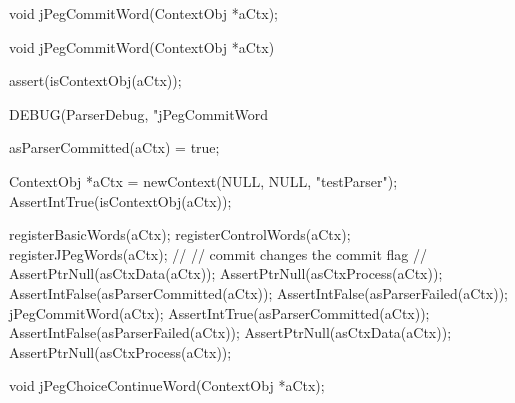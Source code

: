 \startTestSuite[jPegCommitWord]

\startCHeader
void jPegCommitWord(ContextObj *aCtx);
\stopCHeader

\startCCode
void jPegCommitWord(ContextObj *aCtx) {
  assert(isContextObj(aCtx));

  DEBUG(ParserDebug, "jPegCommitWord%
  
  asParserCommitted(aCtx) = true;
}
\stopCCode


\startCTest
  ContextObj *aCtx = newContext(NULL, NULL, "testParser");
  AssertIntTrue(isContextObj(aCtx));
  
  registerBasicWords(aCtx);
  registerControlWords(aCtx);
  registerJPegWords(aCtx);
  //
  // commit changes the commit flag
  //
  AssertPtrNull(asCtxData(aCtx));
  AssertPtrNull(asCtxProcess(aCtx));
  AssertIntFalse(asParserCommitted(aCtx));
  AssertIntFalse(asParserFailed(aCtx));
  jPegCommitWord(aCtx);
  AssertIntTrue(asParserCommitted(aCtx));
  AssertIntFalse(asParserFailed(aCtx));
  AssertPtrNull(asCtxData(aCtx));
  AssertPtrNull(asCtxProcess(aCtx));
\stopCTest
\stopTestCase
\stopTestSuite

\startTestSuite[jPegChoiceContinueWord]

\startCHeader
void jPegChoiceContinueWord(ContextObj *aCtx);
\stopCHeader

